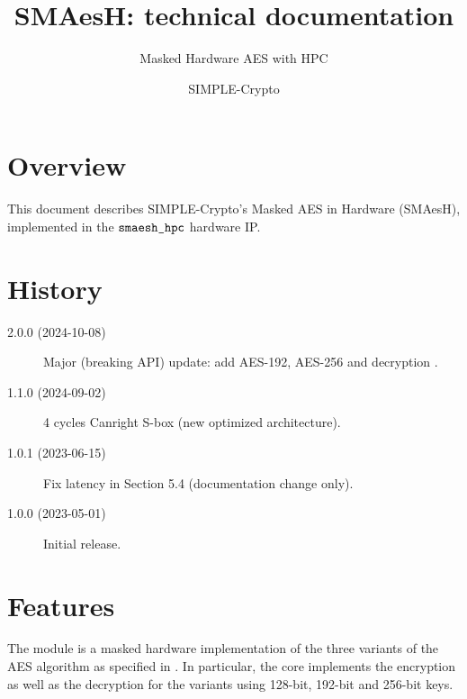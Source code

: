 \documentclass{scrartcl}
\title{SMAesH: technical documentation}
\subtitle{Masked Hardware AES with HPC}
\author{SIMPLE-Crypto}
\date{}
\begin{document}


\maketitle

\tableofcontents

\section{Overview}
\label{section:overview}
This document describes SIMPLE-Crypto's Masked AES in Hardware (SMAesH),
implemented in the $\texttt{smaesh\_hpc}$ hardware IP. 

\section{History}
\begin{description}
    \item[2.0.0 (2024-10-08)] Major (breaking API) update: add AES-192, AES-256 and decryption .
    \item[1.1.0 (2024-09-02)] 4 cycles Canright S-box (new optimized architecture).
    \item[1.0.1 (2023-06-15)] Fix latency in Section 5.4 (documentation change only).
    \item[1.0.0 (2023-05-01)] Initial release.
\end{description}

\section{Features}
The \core{} module is a masked hardware implementation of the three variants of
the AES algorithm as specified in \cite{nist197}. In particular, the core
implements the encryption as well as the decryption for the variants using
128-bit, 192-bit and 256-bit keys.  
\end{document}
